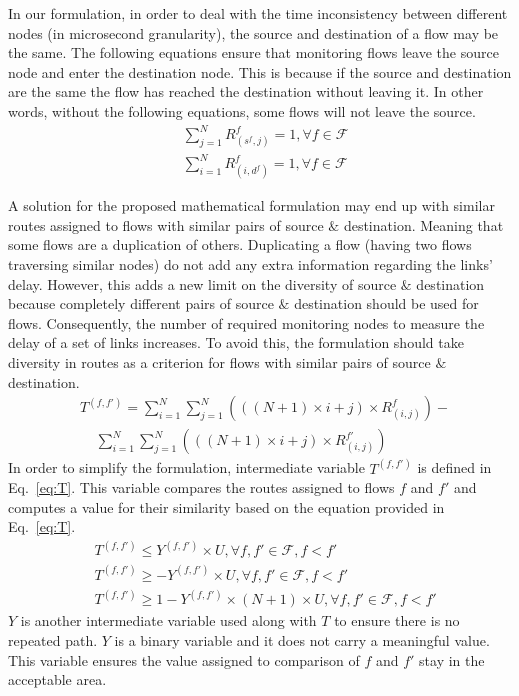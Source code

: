 \documentclass[10pt, journal, letterpaper]{IEEEtran}
\begin{document}
In our formulation, in order to deal with the time inconsistency between different nodes (in microsecond granularity), the source and destination of a flow may be the same. The following equations ensure that monitoring flows leave the source node and enter the destination node. This is because if the source and destination are the same the flow has reached the destination without leaving it. In other words, without the following equations, some flows will not leave the source.
\begin{align}
    & \sum_{j=1}^N{R^f_{(s^f,j)}}=1, \forall f\in \mathcal{F}\\
    & \sum_{i=1}^N{R^f_{(i,d^f)}}=1, \forall f\in \mathcal{F}
\end{align}

A solution for the proposed mathematical formulation may end up with similar routes assigned to flows with similar pairs of source $\&$ destination. Meaning that some flows are a duplication of others. Duplicating a flow (having two flows traversing similar nodes) do not add any extra information regarding the links' delay. However, this adds a new limit on the diversity of source $\&$ destination because completely different pairs of source $\&$ destination should be used for flows. Consequently, the number of required monitoring nodes to measure the delay of a set of links increases. To avoid this, the formulation should take diversity in routes as a criterion for flows with similar pairs of source $\&$ destination.
\begin{align}\label{eq:T}
    & T^{(f,f')} = \sum_{i=1}^N{\sum_{j=1}^N{\left(((N+1)\times i+j)\times R_{(i,j)}^f\right)}} - \nonumber\\ 
    &~~~~~\sum_{i=1}^N{\sum_{j=1}^N{\left(((N+1)\times i+j)\times R_{(i,j)}^{f'}\right)}}
\end{align}    
In order to simplify the formulation, intermediate variable $T^{(f,f')}$ is defined in Eq.~\ref{eq:T}. This variable compares the routes assigned to flows $f$ and $f'$ and computes a value for their similarity based on the equation provided in Eq.~\ref{eq:T}. 
\begin{align}
    & T^{(f,f')} \leq  Y^{(f,f')}\times U, \forall f,f'\in \mathcal{F}, f<f'\\
    & T^{(f,f')} \geq  -Y^{(f,f')}\times U, \forall f,f'\in \mathcal{F}, f<f'\\
    & T^{(f,f')} \geq 1- Y^{(f,f')}\times (N+1)\times U, \forall f,f'\in \mathcal{F}, f<f'
\end{align}
$Y$ is another intermediate variable used along with $T$ to ensure there is no repeated path. $Y$ is a binary variable and it does not carry a meaningful value. This variable ensures the value assigned to comparison of $f$ and $f'$ stay in the acceptable area.
\end{document}
